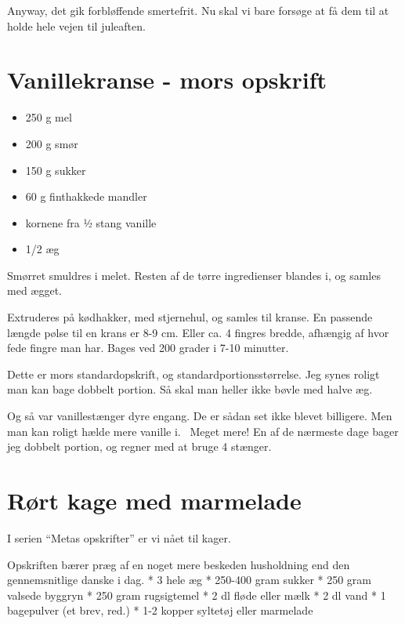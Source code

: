 \documentclass[
  letterpaper,
  DIV=11,
  numbers=noendperiod]{scrreprt}
\providecommand{\tightlist}{%
  \setlength{\itemsep}{0pt}\setlength{\parskip}{0pt}}\usepackage{longtable,booktabs,array}
\begin{document}
Anyway, det gik forbløffende smertefrit. Nu skal vi bare forsøge at få
dem til at holde hele vejen til juleaften.

\hypertarget{vanillekranse---mors-opskrift-1}{%
\section{Vanillekranse - mors
opskrift}\label{vanillekranse---mors-opskrift-1}}

\begin{itemize}
\tightlist
\item
  250 g mel
\item
  200 g smør
\item
  150 g sukker
\item
  60 g finthakkede mandler
\item
  kornene fra ½ stang vanille
\item
  1/2 æg
\end{itemize}

Smørret smuldres i melet. Resten af de tørre ingredienser blandes i, og
samles med ægget.

Extruderes på kødhakker, med stjernehul, og samles til kranse. En
passende længde pølse til en krans er 8-9 cm. Eller ca. 4 fingres
bredde, afhængig af hvor fede fingre man har. Bages ved 200 grader i
7-10 minutter.

Dette er mors standardopskrift, og standardportionsstørrelse. Jeg synes
roligt man kan bage dobbelt portion. Så skal man heller ikke bøvle med
halve æg.

Og så var vanillestænger dyre engang. De er sådan set ikke blevet
billigere. Men man kan roligt hælde mere vanille i.~ Meget mere! En af
de nærmeste dage bager jeg dobbelt portion, og regner med at bruge 4
stænger.

\hypertarget{ruxf8rt-kage-med-marmelade-1}{%
\section{Rørt kage med marmelade}\label{ruxf8rt-kage-med-marmelade-1}}

I serien ``Metas opskrifter'' er vi nået til kager.

Opskriften bærer præg af en noget mere beskeden husholdning end den
gennemsnitlige danske i dag. * 3 hele æg * 250-400 gram sukker * 250
gram valsede byggryn * 250 gram rugsigtemel * 2 dl fløde eller mælk * 2
dl vand * 1 bagepulver (et brev, red.) * 1-2 kopper syltetøj eller
marmelade
\end{document}
